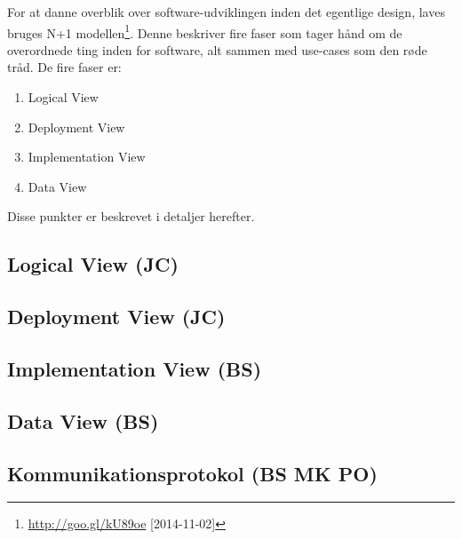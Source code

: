For at danne overblik over software-udviklingen inden det egentlige design, laves bruges N+1 modellen\footnote{\url{http://goo.gl/kU89oe} [2014-11-02]}.
Denne beskriver fire faser som tager hånd om de overordnede ting inden for software, alt sammen med use-cases som den røde tråd.
De fire faser er:

\begin{enumerate}
	\item Logical View
	\item Deployment View
	\item Implementation View
	\item Data View
\end{enumerate}

Disse punkter er beskrevet i detaljer herefter.

\subsection{Logical View (JC)}


\clearpage
\subsection{Deployment View (JC)}



\subsection{Implementation View (BS)}


\subsection{Data View (BS)}


%

\subsection{Kommunikationsprotokol (BS MK PO)}

